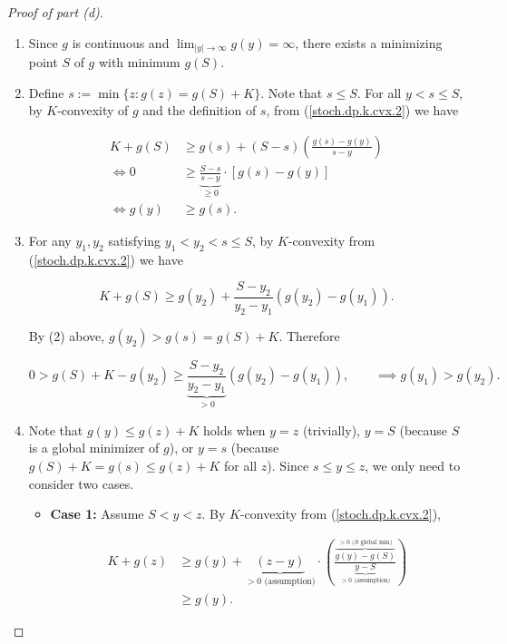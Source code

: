 \begin{proof}[Proof of part (d)]



\begin{enumerate}[(1)]

\item Since \(g\) is continuous and \(\lim_{|y| \to \infty} g(y) = \infty\), there exists a minimizing point \(S\) of \(g\) with minimum \(g(S)\). 

\item Define \(s := \min\{ z: g(z) = g(S) + K\}\). Note that \(s \leq S\). For all \(y < s \leq S\), by \(K\)-convexity of \(g\) and the definition of \(s\), from (\ref{stoch.dp.k.cvx.2}) we have 

\begin{align*}
K + g(S) & \geq g(s) + (S - s) \left(  \frac{g(s) - g(y)}{s - y} \right) \\
\iff 0 & \geq \underbrace{\frac{S-s}{s-y}}_{\geq 0 } \cdot [g(s) - g(y)] \\
\iff g(y) & \geq g(s).
\end{align*}

\item For any \(y_1, y_2\) satisfying \(y_1 < y_2 < s \leq S\), by \(K\)-convexity from (\ref{stoch.dp.k.cvx.2}) we have

\[
K + g(S) \geq g(y_2) + \frac{S - y_2}{y_2 - y_1} (g(y_2) - g(y_1)).
\]

By (2) above, \(g(y_2) > g(s) = g(S) + K\). Therefore

\[
0 > g(S) + K - g(y_2) \geq \underbrace{ \frac{S - y_2}{y_2 - y_1}}_{> 0} (g(y_2) - g(y_1)), \qquad \implies g(y_1) > g(y_2).
\]

\item Note that \(g(y) \leq g(z) + K\) holds when \(y = z\) (trivially), \(y= S\) (because \(S\) is a global minimizer of \(g\)), or \(y = s\) (because \(g(S) + K = g(s) \leq g(z) + K\) for all \(z\)). Since \(s \leq y \leq z\), we only need to consider two cases.

\begin{itemize}

\item \textbf{Case 1:} Assume \(S < y < z\). By \(K\)-convexity from (\ref{stoch.dp.k.cvx.2}), 

\begin{align*}
K + g(z) & \geq g(y) + \underbrace{(z-y)}_{> 0 \text{ (assumption)}} \cdot \left(\frac{ \overbrace{g(y) - g(S)}^{> 0 \text{ (} S \text{ global min)}}}{\underbrace{y - S}_{> 0 \text{ (assumption)}}} \right) \\
& \geq g(y).
\end{align*}


\end{itemize}
\end{enumerate}
\end{proof}
